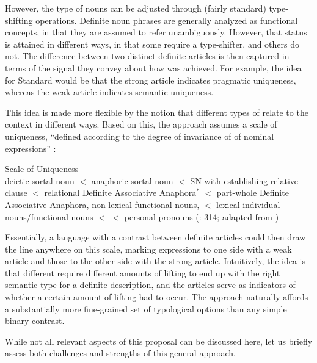 \documentclass[output=paper
,modfonts
,nonflat]{langscibook}
\begin{document}
However, the type of nouns can be adjusted through (fairly standard)
type-shifting operations. Definite noun phrases are generally analyzed as functional
concepts, in that they are assumed to refer unambiguously. However,
that status is attained in different ways, in that some  require
a type-shifter, and others do not. The difference between two distinct
definite articles is then captured in terms of the signal they convey
about how  was achieved. For example, the idea for Standard
 would be that the strong article indicates pragmatic
uniqueness, whereas the weak article indicates semantic uniqueness.

This idea is made more flexible by the notion that different types of
 relate to the context in different ways. Based on
this, the approach assumes a scale of uniqueness, ``defined according to the degree of invariance
of  of nominal expressions'' \citep{Ortmann2014}:

\begin{exe} 
\ex Scale of Uniqueness\\
      deictic sortal noun $<$ anaphoric sortal noun $<$ SN with
      establishing relative clause $<$ relational Definite Associative
      Anaphora$^*$ $<$ part-whole
      Definite Associative
      Anaphora, non-lexical functional nouns, $<$ lexical individual
      nouns/functional nouns $<$  $<$ personal pronouns (\citealt{Ortmann2014}: 314; adapted from \citealt{Loebner2011})
\end{exe}

Essentially, a language with a contrast between definite articles
could then draw the line anywhere on this scale, marking expressions
to one side with a weak article and those to the other side with the
strong article. Intuitively, the
idea is that different  require different amounts of lifting to
end up with the right semantic type for a definite description, and
the articles serve as indicators of whether a certain amount of lifting
had to occur. The approach naturally affords a substantially more fine-grained set of
typological options than any simple binary contrast. 

While not all relevant aspects of this proposal can be discussed here, let
us briefly assess both challenges and strengths of this general
approach. 
\end{document}
